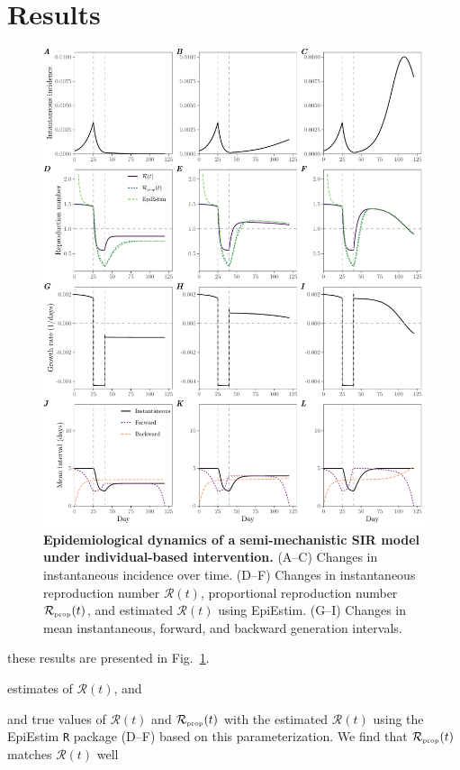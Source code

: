 \documentclass[12pt]{article}
\newcommand{\fref}[1]{Fig.~\ref{fig:#1}}
\newcommand{\RR}{\ensuremath{{\mathcal R}}\xspace}
\newcommand{\tsub}[2]{#1_{{\textrm{\tiny #2}}}}
\begin{document}
\section{Results}

\begin{figure}
\includegraphics[width=\textwidth]{figure_sir_semi.pdf}
\caption{
\textbf{Epidemiological dynamics of a semi-mechanistic SIR model under individual-based intervention.}
(A--C) Changes in instantaneous incidence over time.
(D--F) Changes in instantaneous reproduction number $\RR(t)$, proportional reproduction number $\tsub{\RR}{prop}(t)$, and estimated $\RR(t)$ using EpiEstim.
(G--I) Changes in mean instantaneous, forward, and backward generation intervals.
}
\label{fig:sir_semi}
\end{figure}

these results are presented in \fref{sir_semi}.

estimates of $\RR(t)$, and 

and true values of $\RR(t)$ and $\tsub{\RR}{prop}(t)$ with the estimated $\RR(t)$ using the EpiEstim \texttt{R} package (D--F) based on this parameterization.
We find that $\tsub{\RR}{prop}(t)$ matches $\RR(t)$ well 
\end{document}
